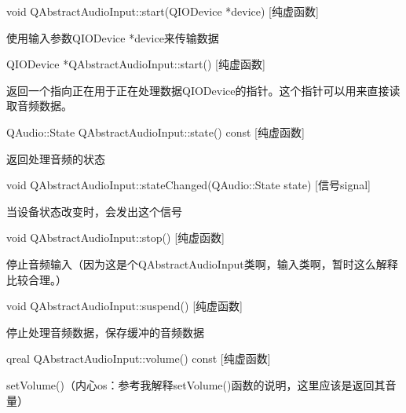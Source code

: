 void QAbstractAudioInput::start(QIODevice *device) [纯虚函数]

使用输入参数QIODevice *device来传输数据

QIODevice *QAbstractAudioInput::start() [纯虚函数]

返回一个指向正在用于正在处理数据QIODevice的指针。这个指针可以用来直接读取音频数据。

QAudio::State QAbstractAudioInput::state() const [纯虚函数]

返回处理音频的状态

void QAbstractAudioInput::stateChanged(QAudio::State state) [信号signal]

当设备状态改变时，会发出这个信号

void QAbstractAudioInput::stop() [纯虚函数]

停止音频输入（因为这是个QAbstractAudioInput类啊，输入类啊，暂时这么解释比较合理。）

void QAbstractAudioInput::suspend() [纯虚函数]

停止处理音频数据，保存缓冲的音频数据

qreal QAbstractAudioInput::volume() const [纯虚函数]


\begin{seeAlso}
setVolume()（内心os：参考我解释setVolume()函数的说明，这里应该是返回其音量）
\end{seeAlso}

